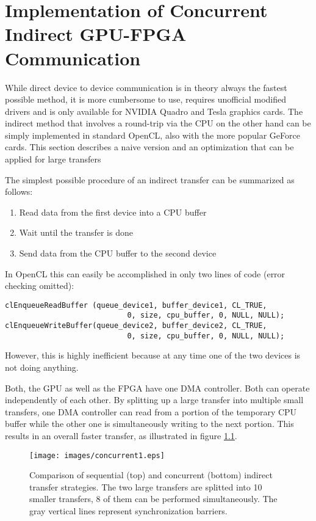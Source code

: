 \chapter{Implementation of Concurrent Indirect GPU-FPGA Communication}
\label{section:concurrent}

While direct device to device communication is in theory always the fastest possible method, it is more cumbersome to use, requires unofficial modified drivers and is only available for NVIDIA Quadro and Tesla graphics cards.
The indirect method that involves a round-trip via the CPU on the other hand can be simply implemented in standard OpenCL, also with the more popular GeForce cards.
This section describes a naive version and an optimization that can be applied for large transfers

The simplest possible procedure of an indirect transfer can be summarized as follows:
\begin{enumerate}
	\item Read data from the first device into a CPU buffer
	\item Wait until the transfer is done
	\item Send data from the CPU buffer to the second device
\end{enumerate}

In OpenCL this can easily be accomplished in only two lines of code (error checking omitted):
\begin{lstlisting}[label=sequential_indirect,caption=Sequential indirect device to device transfer in OpenCL]
clEnqueueReadBuffer (queue_device1, buffer_device1, CL_TRUE, 
                            0, size, cpu_buffer, 0, NULL, NULL);
clEnqueueWriteBuffer(queue_device2, buffer_device2, CL_TRUE, 
                            0, size, cpu_buffer, 0, NULL, NULL);
\end{lstlisting}

However, this is highly inefficient because at any time one of the two devices is not doing anything.

Both, the GPU as well as the FPGA have one DMA controller.
Both can operate independently of each other.
By splitting up a large transfer into multiple small transfers, one DMA controller can read from a portion of the temporary CPU buffer while the other one is simultaneously writing to the next portion.
This results in an overall faster transfer, as illustrated in figure \ref{fig:concurrent1}.


\begin{figure}[htb]
	  \centerline{
		\texttt{[image: images/concurrent1.eps]}}
	  \caption{Comparison of sequential (top) and concurrent (bottom) indirect transfer strategies. The two large transfers are splitted into 10 smaller transfers, 8 of them can be performed simultaneously. The gray vertical lines represent synchronization barriers.}
	  \label{fig:concurrent1}
\end{figure}


